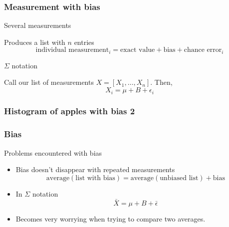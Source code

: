 \documentclass[handout]{beamer}
\begin{document}

   \begin{frame} \frametitle{Measurement  with bias}

   \begin{block}
   {Several measurements}

   Produces a list with $n$ entries
   $$
   \text{individual measurement}_i = \text{exact value} + \text{bias} + \text{chance error}_i
   $$
   \end{block}

   \begin{block}
   {$\Sigma$ notation}

   Call our list of measurements $X=[X_1, \dots, X_n]$.
   Then,
   $$
   X_i = \mu + B + \epsilon_i
   $$
   \end{block}
   \end{frame}



   \begin{frame}
   \frametitle{Histogram of apples with bias 2}
   \begin{center}
   \end{center}

   \end{frame}


   \begin{frame} \frametitle{Bias}

   \begin{block}
   {Problems encountered with bias}
   \begin{itemize}
   \item Bias doesn't disappear with repeated measurements
   $$
   \text{average}(\text{list with bias}) = \text{average}(\text{unbiased list}) + \text{bias}
   $$
   \item In $\Sigma$ notation
   $$
   \bar{X} = \mu + B + \bar{\epsilon}
   $$
   \item Becomes very worrying when trying to compare
   two averages.
   \end{itemize}
   \end{block}
   \end{frame}
\end{document}

